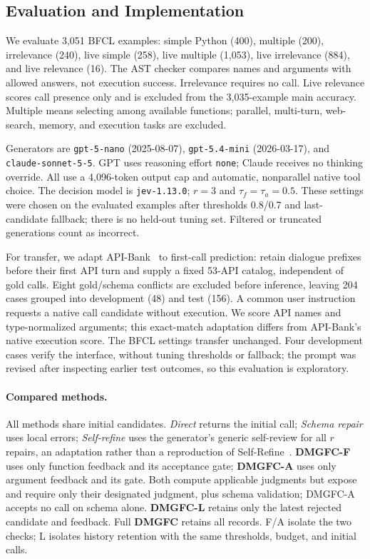 \subsection{Evaluation and Implementation}
\label{sec:data}
We evaluate 3,051 BFCL examples: simple Python (400), multiple (200), irrelevance (240), live simple (258), live multiple (1,053), live irrelevance (884), and live relevance (16). The AST checker compares names and arguments with allowed answers, not execution success. Irrelevance requires no call. Live relevance scores call presence only and is excluded from the 3,035-example main accuracy. Multiple means selecting among available functions; parallel, multi-turn, web-search, memory, and execution tasks are excluded.

Generators are \texttt{gpt-5-nano} (2025-08-07), \texttt{gpt-5.4-mini} (2026-03-17), and \texttt{claude-sonnet-5-5}. GPT uses reasoning effort \texttt{none}; Claude receives no thinking override. All use a 4,096-token output cap and automatic, nonparallel native tool choice. The decision model is \texttt{jev-1.13.0}; $r=3$ and $\tau_f=\tau_a=0.5$. These settings were chosen on the evaluated examples after thresholds 0.8/0.7 and last-candidate fallback; there is no held-out tuning set. Filtered or truncated generations count as incorrect.

For transfer, we adapt API-Bank~\cite{li2023apibank} to first-call prediction: retain dialogue prefixes before their first API turn and supply a fixed 53-API catalog, independent of gold calls. Eight gold/schema conflicts are excluded before inference, leaving 204 cases grouped into development (48) and test (156). A common user instruction requests a native call candidate without execution. We score API names and type-normalized arguments; this exact-match adaptation differs from API-Bank's native execution score. The BFCL settings transfer unchanged. Four development cases verify the interface, without tuning thresholds or fallback; the prompt was revised after inspecting earlier test outcomes, so this evaluation is exploratory.

\paragraph{Compared methods.}
All methods share initial candidates. \emph{Direct} returns the initial call; \emph{Schema repair} uses local errors; \emph{Self-refine} uses the generator's generic self-review for all $r$ repairs, an adaptation rather than a reproduction of Self-Refine~\cite{madaan2023selfrefine}. \textbf{DMGFC-F} uses only function feedback and its acceptance gate; \textbf{DMGFC-A} uses only argument feedback and its gate. Both compute applicable judgments but expose and require only their designated judgment, plus schema validation; DMGFC-A accepts no call on schema alone. \textbf{DMGFC-L} retains only the latest rejected candidate and feedback. Full \textbf{DMGFC} retains all records. F/A isolate the two checks; L isolates history retention with the same thresholds, budget, and initial calls.

